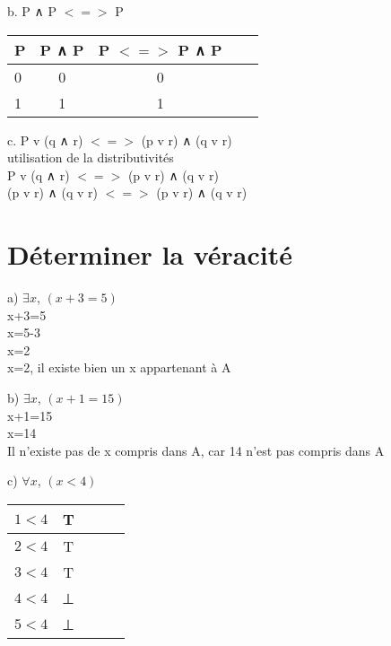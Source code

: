 \vspace{3mm}
b. P ∧ P  $<=>$ P \\

\begin{tabular}{|l|c|c|c|c|}
  \hline
  P & P ∧ P & P $<=>$ P ∧ P \\
  \hline
  0 & 0 & 0 \\
  \hline
  1 & 1 & 1 \\
  \hline
\end{tabular}

\vspace{5mm}
c. P v (q ∧ r) $<=>$ (p v r) ∧ (q v r) \\

utilisation de la distributivités \\

P v (q ∧ r) $<=>$ (p v r) ∧ (q v r) \\

(p v r) ∧ (q v r) $<=>$ (p v r) ∧ (q v r) \\

\newpage

\section{Déterminer la véracité}

a) $∃x$, $(x + 3 = 5)$ \\

x+3=5 \\
x=5-3 \\
x=2 \\

x=2, il existe bien un x appartenant à A \\

\vspace{5mm}

b) $∃x$, $(x + 1 = 15)$ \\

x+1=15 \\
x=14 \\

Il n'existe pas de x compris dans A, car 14 n'est pas compris dans A \\

\vspace{5mm}

c) $∀x$, $(x < 4)$ \\

\begin{tabular}{|l|c|c|c|c|}
  \hline
  $1 < 4$ & T \\
  \hline
  $2 < 4$ & T \\
  \hline
  $3 < 4$ & T \\
  \hline
  $4 < 4$ & ⊥ \\
  \hline
  $5 < 4$ & ⊥ \\
  \hline
\end{tabular}

